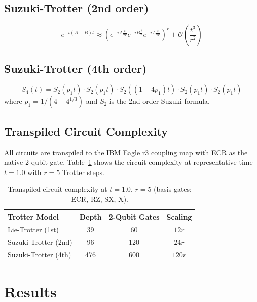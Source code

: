 \documentclass[11pt,a4paper]{article}
\begin{document}
\subsection{Suzuki-Trotter (2nd order)}
\begin{equation}
    e^{-i(A+B)t} \approx \left( e^{-iA\frac{t}{2r}} e^{-iB\frac{t}{r}} e^{-iA\frac{t}{2r}} \right)^r + \mathcal{O}\left(\frac{t^3}{r^2}\right)
\end{equation}

\subsection{Suzuki-Trotter (4th order)}
\begin{equation}
    S_4(t) = S_2(p_1 t) \cdot S_2(p_1 t) \cdot S_2((1-4p_1)t) \cdot S_2(p_1 t) \cdot S_2(p_1 t)
\end{equation}
where $p_1 = 1/(4 - 4^{1/3})$ and $S_2$ is the 2nd-order Suzuki formula.

\subsection{Transpiled Circuit Complexity}

All circuits are transpiled to the IBM Eagle r3 coupling map with ECR as the native 2-qubit gate. Table~\ref{tab:circuit_complexity} shows the circuit complexity at representative time $t=1.0$ with $r=5$ Trotter steps.

\begin{table}[H]
\centering
\caption{Transpiled circuit complexity at $t=1.0$, $r=5$ (basis gates: ECR, RZ, SX, X).}
\label{tab:circuit_complexity}
\begin{tabular}{lccc}
\toprule
Trotter Model & Depth & 2-Qubit Gates & Scaling \\
\midrule
Lie-Trotter (1st) & 39 & 60 & $12r$ \\
Suzuki-Trotter (2nd) & 96 & 120 & $24r$ \\
Suzuki-Trotter (4th) & 476 & 600 & $120r$ \\
\bottomrule
\end{tabular}
\end{table}

\section{Results}
\end{document}
